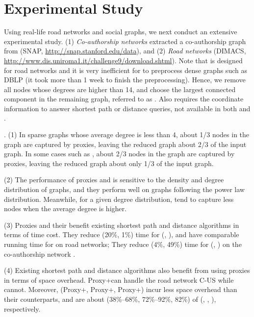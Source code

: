 \section{Experimental Study}
\label{sec-expt}


Using real-life road networks and social graphs, we next conduct an extensive experimental study. 
(1) {\em Co-authorship networks} extracted a co-authorship graph from \dblp (SNAP, \url{http://snap.stanford.edu/data}),
 and (2) {\em Road networks} (DIMACS, \url{http://www.dis.uniroma1.it/challenge9/download.shtml}).
Note that \tnr is designed for road networks and it is very inefficient for \tnr to preprocess dense graphs such as DBLP (it took more than 1 week to finish the preprocessing). Hence, we remove all nodes whose degrees are higher than 14, and choose the largest connected component in the remaining graph, referred to as \dblpone. Also \ah requires the coordinate information to answer shortest path or distance queries, not available in both \dblp and \dblpone.

.
(1) In sparse graphs whose average degree is less than 4, about 1/3 nodes in the graph are captured by proxies, leaving the reduced graph about 2/3 of the input graph. In some cases such as \dblpone, about 2/3 nodes in the graph are captured by proxies, leaving the reduced graph about only 1/3 of the input graph.

\sstab(2) The performance of proxies and \dras is sensitive to the density and degree distribution of graphs, and they perform well on graphs following the power law distribution. Meanwhile, for a given degree distribution, \dras tend to capture less nodes when the average degree is higher. 

\sstab(3) Proxies and their \dras benefit existing shortest path and distance algorithms in terms of time cost. They reduce (20\%, 1\%) time for (\arcflag, \ah), and have comparable running time for \tnr on road networks; They reduce (4\%, 49\%) time for (\arcflag, \tnr) on the co-authorship network \dblpone.

\sstab(4) Existing shortest path and distance algorithms also benefit from using proxies in terms of space overhead. Proxy+\tnr can handle the road network C-US while \tnr cannot. Moreover, (Proxy+\arcflag, Proxy+\tnr, Proxy+\ah) incur less space overhead than their counterparts, and are about (38\%--68\%, 72\%--92\%, 82\%) of (\arcflag, \tnr, \ah), respectively.

